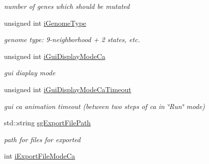 \begin{DoxyCompactItemize}
\begin{DoxyCompactList}\small\item\em number of genes which should be mutated \item\end{DoxyCompactList}\item 
\hypertarget{classCConfigCore_a1d25c6b8e6967bcff9264ae2d9d26332}{
unsigned int \hyperlink{classCConfigCore_a1d25c6b8e6967bcff9264ae2d9d26332}{iGenomeType}}
\label{classCConfigCore_a1d25c6b8e6967bcff9264ae2d9d26332}

\begin{DoxyCompactList}\small\item\em genome type: 9-\/neighborhood + 2 states, etc. \item\end{DoxyCompactList}\item 
\hypertarget{classCConfigCore_a0498757f8539176bbe6f98c33f2df285}{
unsigned int \hyperlink{classCConfigCore_a0498757f8539176bbe6f98c33f2df285}{iGuiDisplayModeCa}}
\label{classCConfigCore_a0498757f8539176bbe6f98c33f2df285}

\begin{DoxyCompactList}\small\item\em gui diaplay mode \item\end{DoxyCompactList}\item 
\hypertarget{classCConfigCore_a99d279d84fedd22e1244885779de4cdf}{
unsigned int \hyperlink{classCConfigCore_a99d279d84fedd22e1244885779de4cdf}{iGuiDisplayModeCaTimeout}}
\label{classCConfigCore_a99d279d84fedd22e1244885779de4cdf}

\begin{DoxyCompactList}\small\item\em gui ca animation timeout (between two steps of ca in \char`\"{}Run\char`\"{} mode) \item\end{DoxyCompactList}\item 
\hypertarget{classCConfigCore_a0b84dcc6083a6d1f56245b6e847c5b8d}{
std::string \hyperlink{classCConfigCore_a0b84dcc6083a6d1f56245b6e847c5b8d}{sgExportFilePath}}
\label{classCConfigCore_a0b84dcc6083a6d1f56245b6e847c5b8d}

\begin{DoxyCompactList}\small\item\em path for files for exported \item\end{DoxyCompactList}\item 
\hypertarget{classCConfigCore_ae94d0e50bb1d83b930d5a23be3bb73c8}{
int \hyperlink{classCConfigCore_ae94d0e50bb1d83b930d5a23be3bb73c8}{iExportFileModeCa}}
\label{classCConfigCore_ae94d0e50bb1d83b930d5a23be3bb73c8}


\end{DoxyCompactItemize}

